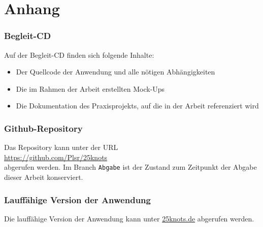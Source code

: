 \chapter{Anhang}
\subsection{Begleit-CD}
Auf der Begleit-CD finden sich folgende Inhalte:

\begin{itemize}
  \item Der Quellcode der Anwendung und alle nötigen Abhängigkeiten
  \item Die im Rahmen der Arbeit erstellten Mock-Ups
  \item Die Dokumentation des Praxisprojekts, auf die in der Arbeit referenziert wird
\end{itemize}

\subsection{Github-Repository}
Das Repository kann unter der URL\\

\url{https://github.com/Plsr/25knots}\\

abgerufen werden. Im Branch \texttt{Abgabe} ist der Zustand zum Zeitpunkt der Abgabe dieser Arbeit konserviert.

\subsection{Lauffähige Version der Anwendung}
Die lauffähige Version der Anwendung kann unter \url{25knots.de} abgerufen werden.
